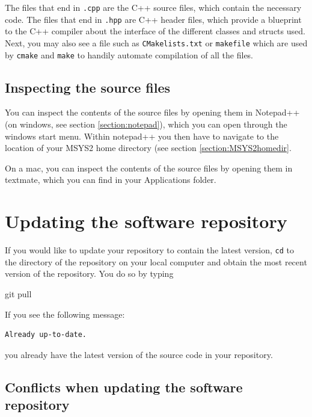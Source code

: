 \documentclass[
]{book}
\newenvironment{Shaded}{\begin{snugshade}}{\end{snugshade}}
\newcommand{\FunctionTok}[1]{\textcolor[rgb]{0.00,0.00,0.00}{#1}}
\newcommand{\NormalTok}[1]{#1}
\begin{document}
The files that end in \texttt{.cpp} are the C++ source files, which contain the necessary
code. The files that end in \texttt{.hpp}
are C++ header files, which provide a blueprint to the C++ compiler about
the interface of the different classes and structs used. Next, you may also
see a file such as \texttt{CMakelists.txt} or \texttt{makefile} which are used by \texttt{cmake}
and \texttt{make} to handily automate compilation of all the files.

\hypertarget{inspecting-the-source-files}{%
\subsection{Inspecting the source files}\label{inspecting-the-source-files}}

You can inspect the contents of the source files by opening them in
Notepad++ (on windows, see section \ref{section:notepad}), which you can open through the windows start menu. Within notepad++
you then have to navigate to the location of your MSYS2 home directory (see section \ref{section:MSYS2homedir}.

On a mac, you can inspect the contents of the source files by opening them in
textmate, which you can find in your Applications folder.

\hypertarget{updating-the-software-repository}{%
\section{Updating the software repository}\label{updating-the-software-repository}}

If you would like to update your repository to contain the latest version, \texttt{cd} to the directory of the repository on your local computer and obtain the most recent version of the repository. You do so by typing

\begin{Shaded}
\begin{Highlighting}[]
\FunctionTok{git}\NormalTok{ pull}
\end{Highlighting}
\end{Shaded}

If you see the following message:

\begin{verbatim}
Already up-to-date.
\end{verbatim}

you already have the latest version of the source code in your repository.

\hypertarget{conflicts-when-updating-the-software-repository}{%
\subsection{Conflicts when updating the software repository}\label{conflicts-when-updating-the-software-repository}}
\end{document}
